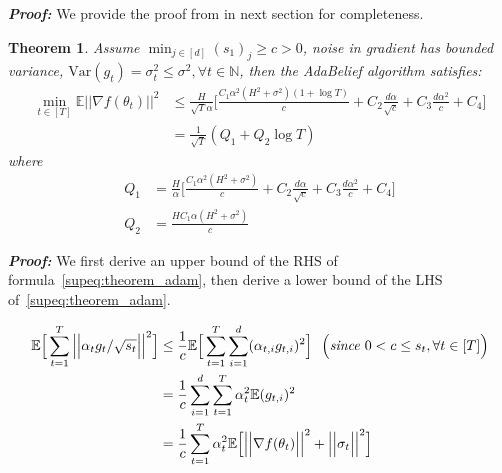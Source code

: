 \documentclass{article}
\newtheorem{theorem}{Theorem}[section]
\begin{document}
\textbf{ \textit{Proof: }} We provide the proof from \cite{chen2018convergence} in next section for completeness. \hfill \qedsymbol
\begin{theorem}
\label{suptheorem:adabelief_stochastic}
Assume $\operatorname*{min}_{j \in [d]} (s_1)_j \geq c > 0$, noise in gradient has bounded variance, $\mathrm{Var} (g_t) = \sigma_t^2 \leq \sigma^2, \forall t \in \mathbb{N}$, then the AdaBelief algorithm satisfies: %
\begin{align*}
\operatorname*{min}_{t \in [T]} \mathbb{E} \Big \vert \Big \vert \nabla f(\theta_t ) \Big \vert \Big \vert^2 &\leq \frac{H}{\sqrt{T} \alpha} \Big[ \frac{C_1 \alpha^2 (H^2 + \sigma^2)(1+\log T)}{c} + C_2 \frac{d \alpha}{\sqrt{c}} + C_3 \frac{d \alpha^2}{c} + C_4 \Big] \nonumber \\
& = \frac{1}{\sqrt{T}} (Q_1 + Q_2 \log T)
\end{align*}
where 
\begin{align*}
Q_1&= \frac{H}{\alpha} \Big[ \frac{C_1 \alpha^2 (H^2 + \sigma^2)}{c} + C_2 \frac{d \alpha}{\sqrt{c}} + C_3 \frac{d \alpha^2}{c} + C_4 \Big] \\
Q_2&= \frac{H C_1 \alpha (H^2 + \sigma^2)}{c}
\end{align*}
\end{theorem}
\textbf{ \textit{Proof: }} We first derive an upper bound of the RHS of formula~\eqref{supeq:theorem_adam}, then derive a lower bound of the LHS of~\eqref{supeq:theorem_adam}. 

\begin{align}
\label{supeq:bound1}
\mathbb{E} \Big[ \sum_{t=1}^T  \Big \vert \Big \vert \alpha_t g_t / \sqrt{s_t} \Big \vert \Big \vert^2 \Big] &\leq \frac{1}{c} \mathbb{E} \Big[ \sum_{t=1}^T \sum_{i=1}^d (\alpha_{t,i} g_{t,i})^2 \Big] \ \ \Big( \textit{since\ }0<c\leq s_t, \forall t \in [T] \Big) \nonumber \\
& = \frac{1}{c} \sum_{i=1}^d \sum_{t=1}^T \alpha_{t}^2 \mathbb{E}(g_{t,i})^2 \nonumber \\
&= \frac{1}{c}  \sum_{t=1}^T  \alpha_{t}^2 \mathbb{E} \Big[ {\color{black} \Big \vert \Big \vert \nabla f(\theta_t ) \Big \vert \Big \vert^2 + \Big \vert \Big \vert \sigma_t \Big \vert \Big \vert^2} \Big]
\end{align}
\end{document}
